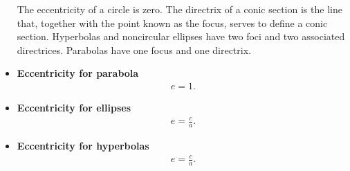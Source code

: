 \documentclass{report}
\begin{document}
\begin{itemize}
\begin{itemize}
    \end{itemize}
    The eccentricity of a circle is zero. The directrix of a conic section is the line that, together with the point known as the focus, serves to define a conic section. Hyperbolas and noncircular ellipses have two foci and two associated directrices. Parabolas have one focus and one directrix.
    \bigbreak \noindent 
    \item \textbf{Eccentricity for parabola}
        \begin{align*}
            e=1
        .\end{align*}
    \item \textbf{Eccentricity for ellipses}
        \begin{align*}
            e = \frac{c}{a}
        .\end{align*}
    \item \textbf{Eccentricity for hyperbolas}
        \begin{align*}
            e = \frac{c}{a}
        .\end{align*}

    \end{itemize}
    \bigbreak \noindent 
\end{document}
